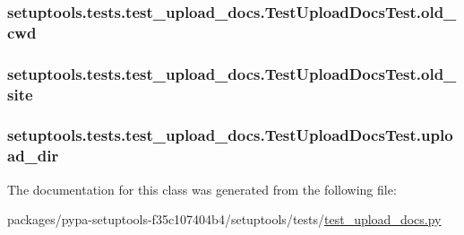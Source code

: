 \subsubsection[{old\+\_\+cwd}]{\setlength{\rightskip}{0pt plus 5cm}setuptools.\+tests.\+test\+\_\+upload\+\_\+docs.\+Test\+Upload\+Docs\+Test.\+old\+\_\+cwd}\label{classsetuptools_1_1tests_1_1test__upload__docs_1_1TestUploadDocsTest_a1839f5fc2bd5065b4675959a625c118e}
\hypertarget{classsetuptools_1_1tests_1_1test__upload__docs_1_1TestUploadDocsTest_afc4cd9a32253d5b2620ccaf40abf5dbc}{}
\subsubsection[{old\+\_\+site}]{\setlength{\rightskip}{0pt plus 5cm}setuptools.\+tests.\+test\+\_\+upload\+\_\+docs.\+Test\+Upload\+Docs\+Test.\+old\+\_\+site}\label{classsetuptools_1_1tests_1_1test__upload__docs_1_1TestUploadDocsTest_afc4cd9a32253d5b2620ccaf40abf5dbc}
\hypertarget{classsetuptools_1_1tests_1_1test__upload__docs_1_1TestUploadDocsTest_a1cdc19cd5c667ca4b0bb03ac68762f71}{}
\subsubsection[{upload\+\_\+dir}]{\setlength{\rightskip}{0pt plus 5cm}setuptools.\+tests.\+test\+\_\+upload\+\_\+docs.\+Test\+Upload\+Docs\+Test.\+upload\+\_\+dir}\label{classsetuptools_1_1tests_1_1test__upload__docs_1_1TestUploadDocsTest_a1cdc19cd5c667ca4b0bb03ac68762f71}


The documentation for this class was generated from the following file\+:\begin{DoxyCompactItemize}
\item 
packages/pypa-\/setuptools-\/f35c107404b4/setuptools/tests/\hyperlink{test__upload__docs_8py}{test\+\_\+upload\+\_\+docs.\+py}\end{DoxyCompactItemize}
